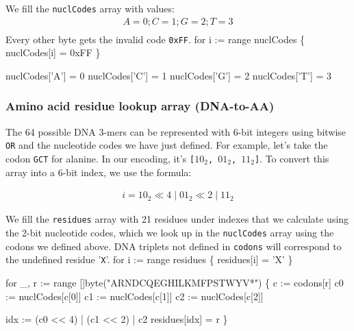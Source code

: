 We fill the \texttt{nuclCodes} array with values:
\begin{gather*}
A = 0; C = 1; G = 2; T = 3 \\
\end{gather*}
Every other byte gets the invalid code \texttt{0xFF}.
\nwenddocs{}\endmoddef\nwstartdeflinemarkup{}\nwenddeflinemarkup
for i := range nuclCodes \{
          nuclCodes[i] = 0xFF
\}

nuclCodes['A'] = 0
nuclCodes['C'] = 1
nuclCodes['G'] = 2
nuclCodes['T'] = 3
\nwendcode{}\nwdocspar
\subsubsection{Amino acid residue lookup array (DNA-to-AA)}
The 64 possible DNA 3-mers can be represented with 6-bit integers
using bitwise \texttt{OR} and the nucleotide codes we have just
defined. For example, let's take the codon \texttt{GCT} for
alanine. In our encoding, it's \texttt{[$10_2$, $01_2$, $11_2$]}. To
convert this array into a 6-bit index, we use the formula:

\begin{gather*}
i = 10_2 \ll 4 \mathbin{|} 01_2 \ll 2 \mathbin{|} 11_2
\end{gather*}

We fill the \texttt{residues} array with 21 residues under indexes
that we calculate using the 2-bit nucleotide codes, which we look up
in the \texttt{nuclCodes} array using the codons we defined above. DNA
triplets not defined in \texttt{codons} will correspond to the
undefined residue '\texttt{X}'.
\nwenddocs{}\endmoddef\nwstartdeflinemarkup{}\nwenddeflinemarkup
for i := range residues \{
          residues[i] = 'X'
\}

for _, r := range []byte("ARNDCQEGHILKMFPSTWYV*") \{
          c := codons[r]
          c0 := nuclCodes[c[0]]
          c1 := nuclCodes[c[1]]
          c2 := nuclCodes[c[2]]
        
          idx := (c0 << 4) | (c1 << 2) | c2
          residues[idx] = r
\}
\nwendcode{}\nwdocspar
